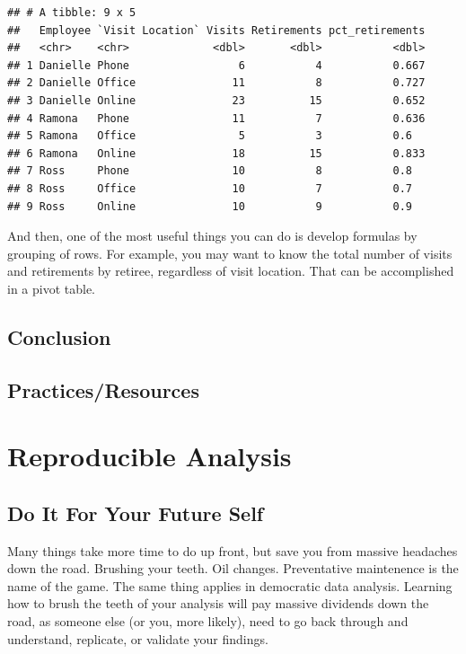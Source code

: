 \documentclass[]{book}
\begin{document}
\begin{verbatim}
## # A tibble: 9 x 5
##   Employee `Visit Location` Visits Retirements pct_retirements
##   <chr>    <chr>             <dbl>       <dbl>           <dbl>
## 1 Danielle Phone                 6           4           0.667
## 2 Danielle Office               11           8           0.727
## 3 Danielle Online               23          15           0.652
## 4 Ramona   Phone                11           7           0.636
## 5 Ramona   Office                5           3           0.6  
## 6 Ramona   Online               18          15           0.833
## 7 Ross     Phone                10           8           0.8  
## 8 Ross     Office               10           7           0.7  
## 9 Ross     Online               10           9           0.9
\end{verbatim}

And then, one of the most useful things you can do is develop formulas by grouping of rows. For example, you may want to know the total number of visits and retirements by retiree, regardless of visit location. That can be accomplished in a pivot table.

\hypertarget{conclusion}{%
\section{Conclusion}\label{conclusion}}

\hypertarget{practicesresources}{%
\section{Practices/Resources}\label{practicesresources}}

\hypertarget{reproducible-analysis}{%
\chapter{Reproducible Analysis}\label{reproducible-analysis}}

\hypertarget{do-it-for-your-future-self}{%
\section{Do It For Your Future Self}\label{do-it-for-your-future-self}}

Many things take more time to do up front, but save you from massive headaches down the road. Brushing your teeth. Oil changes. Preventative maintenence is the name of the game. The same thing applies in democratic data analysis. Learning how to brush the teeth of your analysis will pay massive dividends down the road, as someone else (or you, more likely), need to go back through and understand, replicate, or validate your findings.
\end{document}
